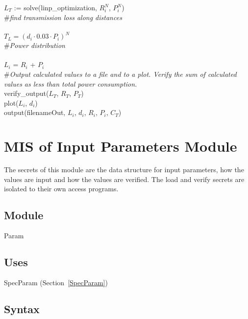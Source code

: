\documentclass[12pt, titlepage]{article}
\begin{document}
\noindent $L_T$ := solve(linp\_optimization,
$R_i^N$, $P_i^N$)\\


\noindent \#\textit{find transmission loss along distances}\\
\\
\indent $T_L = (d_i \cdot 0.03 \cdot P_i)^{N}$\\

\noindent \#\textit{Power distribution}\\
\\
\indent $L_i$ = $R_i$ + $P_i$ \\

\noindent \#\textit{Output calculated values to a file and to a plot.  Verify
 the sum of calculated values as less than total power consumption.}\\

\noindent verify\_output($L_T$, $R_T$, $P_T$)\\

\noindent plot($L_i$, $d_i$)\\

\noindent output(filenameOut, $L_i$, $d_i$, $R_i$, $P_i$, $C_T$)\\

\newpage

\section{MIS of Input Parameters Module} \label{Parameters}

The secrets of this module are the data structure for input parameters, how the
values are input and how the values are verified.  The load and verify secrets
are isolated to their own access programs.

\subsection{Module}

Param

\subsection{Uses}

SpecParam (Section~\ref{SpecParam})

\subsection{Syntax}
\end{document}
